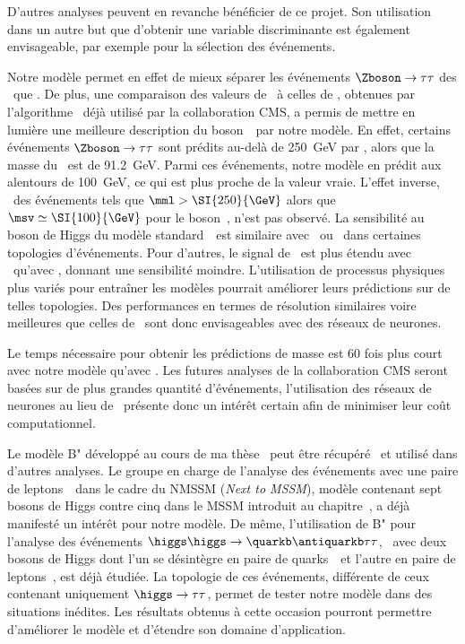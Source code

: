 D'autres analyses peuvent en revanche bénéficier de ce projet.
Son utilisation dans un autre but que d'obtenir une variable discriminante est également envisageable,
par exemple pour la sélection des événements.
\par
Notre modèle permet en effet de mieux séparer les événements $\Zboson\to\tau\tau$ des \ftauhs\ que \mTtot.
De plus, une comparaison des valeurs de \mml\ à celles de \msv, obtenues par l'algorithme \SVFIT\ déjà utilisé par la collaboration CMS,
a permis de mettre en lumière une meilleure description du boson~\Zboson\ par notre modèle.
En effet, certains événements $\Zboson\to\tau\tau$ sont prédits au-delà de \SI{250}{\GeV} par \SVFIT,
alors que la masse du \Zboson\ est de \SI{91.2}{\GeV}.
Parmi ces événements, notre modèle en prédit aux alentours de \SI{100}{\GeV}, ce qui est plus proche de la valeur vraie.
L'effet inverse,
\ie\ des événements tels que $\mml>\SI{250}{\GeV}$ alors que $\msv\simeq\SI{100}{\GeV}$ pour le boson~\Zboson,
n'est pas observé.
La sensibilité au boson de Higgs du modèle standard~\higgs\ est similaire avec \msv\ ou \mml\ dans certaines topologies d'événements.
Pour d'autres, le signal de \higgs\ est plus étendu avec \mml\ qu'avec \msv, donnant une sensibilité moindre.
L'utilisation de processus physiques plus variés pour entraîner les modèles pourrait améliorer leurs prédictions sur de telles topologies.
Des performances en termes de résolution similaires voire meilleures que celles de \SVFIT\ sont donc envisageables avec des réseaux de neurones.
\par
Le temps nécessaire pour obtenir les prédictions de masse est 60 fois plus court avec notre modèle qu'avec \SVFIT.
Les futures analyses de la collaboration CMS seront basées sur de plus grandes quantité d'événements,
l'utilisation des réseaux de neurones au lieu de \SVFIT\ présente donc un intérêt certain afin de minimiser leur coût computationnel.
\par
Le modèle B" développé au cours de ma thèse~\cite{DL_for_HTT_mass} peut être récupéré~\cite{DiTau_ML_mass} et utilisé dans d'autres analyses.
Le groupe en charge de
l'analyse des événements avec une paire de leptons~\tau\ dans le cadre du NMSSM (\emph{Next to MSSM}),
modèle contenant sept bosons de Higgs contre cinq dans le MSSM introduit au chapitre~,
a déjà manifesté un intérêt pour notre modèle.
De même,
l'utilisation de B" pour l'analyse des événements $\higgs\higgs\to\quarkb\antiquarkb\tau\tau$,
\ie\
avec deux bosons de Higgs dont l'un se désintègre en paire de quarks~\quarkb\
et l'autre en paire de leptons~\tau,
est déjà étudiée.
La topologie de ces événements, différente de ceux contenant uniquement $\higgs\to\tau\tau$, permet de tester notre modèle dans des situations inédites.
Les résultats obtenus à cette occasion pourront permettre d'améliorer le modèle et d'étendre son domaine d'application.